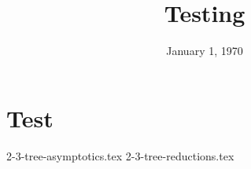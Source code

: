 \documentclass[11pt]{exam}
\title{Testing}
\date{January 1, 1970}
\begin{document}
\maketitle

\section{Test}
{2-3-tree-asymptotics.tex}
{2-3-tree-reductions.tex}
\end{document}
